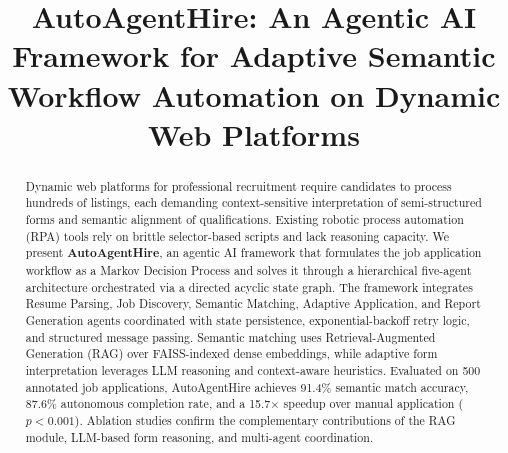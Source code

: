 \documentclass[conference]{IEEEtran}
\begin{document}
\title{AutoAgentHire: An Agentic AI Framework for Adaptive Semantic Workflow Automation on Dynamic Web Platforms}

\author{
}

\maketitle

\begin{abstract}
Dynamic web platforms for professional recruitment require candidates to process hundreds of listings, each demanding context-sensitive interpretation of semi-structured forms and semantic alignment of qualifications. Existing robotic process automation (RPA) tools rely on brittle selector-based scripts and lack reasoning capacity.
We present \textbf{AutoAgentHire}, an agentic AI framework that formulates the job application workflow as a Markov Decision Process and solves it through a hierarchical five-agent architecture orchestrated via a directed acyclic state graph. The framework integrates Resume Parsing, Job Discovery, Semantic Matching, Adaptive Application, and Report Generation agents coordinated with state persistence, exponential-backoff retry logic, and structured message passing. Semantic matching uses Retrieval-Augmented Generation (RAG) over FAISS-indexed dense embeddings, while adaptive form interpretation leverages LLM reasoning and context-aware heuristics. Evaluated on 500 annotated job applications, AutoAgentHire achieves 91.4\% semantic match accuracy, 87.6\% autonomous completion rate, and a 15.7$\times$ speedup over manual application ($p < 0.001$). Ablation studies confirm the complementary contributions of the RAG module, LLM-based form reasoning, and multi-agent coordination.
\end{abstract}
\end{document}
